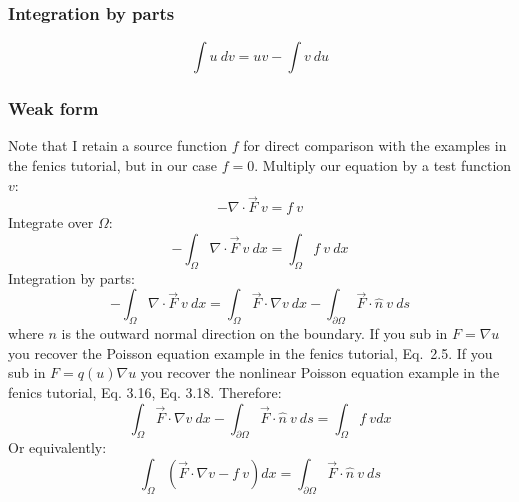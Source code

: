 \subsubsection{Integration by parts}
\begin{equation}
\int u\ dv = uv - \int  v\ du
\end{equation}

\subsubsection{Weak form}
Note that I retain a source function $f$ for direct comparison with the examples in the fenics tutorial, but in our case $f=0$.  Multiply our equation by a test function $v$:
\begin{equation}
- \nabla \cdot \vec{F}\ v = f\ v
\end{equation}
Integrate over $\Omega$:
\begin{equation}
- \int_\Omega \nabla \cdot \vec{F}\ v\ dx = \int_\Omega f\ v\ dx
\end{equation}
Integration by parts:
\begin{equation}
- \int_\Omega \nabla \cdot \vec{F}\ v\ dx = \int_\Omega \vec{F} \cdot \nabla v\ dx - \int_{\partial \Omega} \vec{F} \cdot \hat{n}\ v\ ds
\end{equation}
where $n$ is the outward normal direction on the boundary.  If you sub in $F=\nabla u$ you recover the Poisson equation example in the fenics tutorial, Eq.~2.5.  If you sub in $F=q(u) \nabla u$ you recover the nonlinear Poisson equation example in the fenics tutorial, Eq. 3.16, Eq. 3.18.  Therefore:
\begin{equation}
\int_\Omega \vec{F} \cdot \nabla v\ dx - \int_{\partial \Omega} \vec{F} \cdot \hat{n}\ v\ ds = \int_\Omega f\ v dx
\end{equation}
Or equivalently:
\begin{equation}
\int_\Omega (\vec{F} \cdot \nabla v - f\ v) dx = \int_{\partial \Omega} \vec{F} \cdot \hat{n}\ v\ ds
\end{equation}


